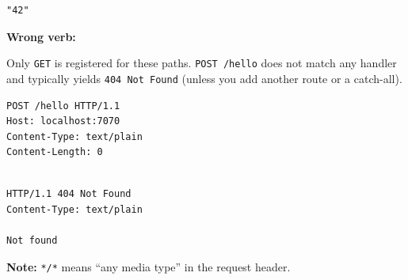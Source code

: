 \begin{solution}
\begin{httpexchange}
\begin{lstlisting}[style=http]
"42"
\end{lstlisting}
  \end{httpexchange}

  \noindent\textbf{Wrong verb:}\par
  \noindent Only \texttt{GET} is registered for these paths. \texttt{POST /hello} does not match any handler and typically yields \texttt{404 Not Found} (unless you add another route or a catch-all).\par
  \begin{httpexchange}
\begin{lstlisting}[style=http]
POST /hello HTTP/1.1
Host: localhost:7070
Content-Type: text/plain
Content-Length: 0


\end{lstlisting}
\httpmidarrows
\begin{lstlisting}[style=http]
HTTP/1.1 404 Not Found
Content-Type: text/plain

Not found
\end{lstlisting}
  \end{httpexchange}

  \noindent\textbf{Note:}
  \texttt{*/*} means ``any media type'' in the request header.
\end{solution}


\newpage

